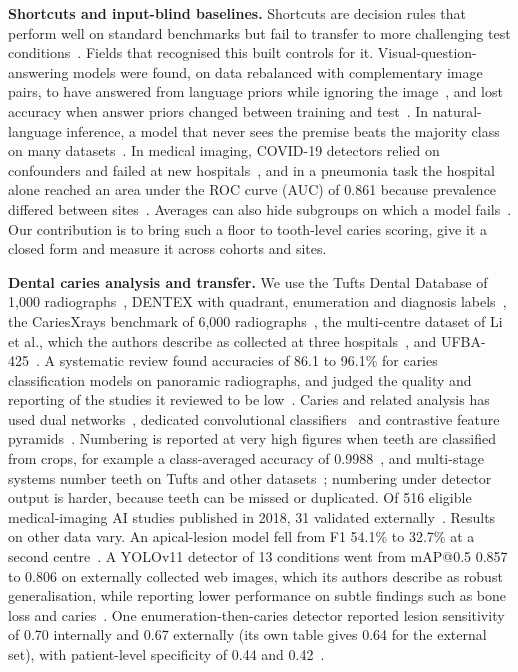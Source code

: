 \documentclass[conference]{IEEEtran}
\begin{document}
\textbf{Shortcuts and input-blind baselines.} Shortcuts are decision rules that perform well on standard benchmarks but fail to transfer to more challenging test conditions~\cite{geirhos2020shortcut}. Fields that recognised this built controls for it. Visual-question-answering models were found, on data rebalanced with complementary image pairs, to have answered from language priors while ignoring the image~\cite{goyal2017making}, and lost accuracy when answer priors changed between training and test~\cite{agrawal2018dont}. In natural-language inference, a model that never sees the premise beats the majority class on many datasets~\cite{poliak2018hypothesis}. In medical imaging, COVID-19 detectors relied on confounders and failed at new hospitals~\cite{degrave2021ai}, and in a pneumonia task the hospital alone reached an area under the ROC curve (AUC) of 0.861 because prevalence differed between sites~\cite{zech2018variable}. Averages can also hide subgroups on which a model fails~\cite{oakdenrayner2020hidden}. Our contribution is to bring such a floor to tooth-level caries scoring, give it a closed form and measure it across cohorts and sites.

\textbf{Dental caries analysis and transfer.} We use the Tufts Dental Database of 1,000 radiographs~\cite{panetta2022tufts}, DENTEX with quadrant, enumeration and diagnosis labels~\cite{hamamci2023dentex}, the CariesXrays benchmark of 6,000 radiographs~\cite{chen2024cariesxrays}, the multi-centre dataset of Li et al., which the authors describe as collected at three hospitals~\cite{li2024multicenter}, and UFBA-425~\cite{budagam2024oralbbnet}. A systematic review found accuracies of 86.1 to 96.1\% for caries classification models on panoramic radiographs, and judged the quality and reporting of the studies it reviewed to be low~\cite{mohammadrahimi2022deep}. Caries and related analysis has used dual networks~\cite{lim2024dual}, dedicated convolutional classifiers~\cite{bilal2024pdcnet} and contrastive feature pyramids~\cite{chen2024cariesxrays}. Numbering is reported at very high figures when teeth are classified from crops, for example a class-averaged accuracy of 0.9988~\cite{zancan2025ai}, and multi-stage systems number teeth on Tufts and other datasets~\cite{zhang2025reliable}; numbering under detector output is harder, because teeth can be missed or duplicated. Of 516 eligible medical-imaging AI studies published in 2018, 31 validated externally~\cite{kim2019design}. Results on other data vary. An apical-lesion model fell from F1 54.1\% to 32.7\% at a second centre~\cite{krois2021generalizability}. A YOLOv11 detector of 13 conditions went from mAP@0.5 0.857 to 0.806 on externally collected web images, which its authors describe as robust generalisation, while reporting lower performance on subtle findings such as bone loss and caries~\cite{mutlu2026comparison}. One enumeration-then-caries detector reported lesion sensitivity of 0.70 internally and 0.67 externally (its own table gives 0.64 for the external set), with patient-level specificity of 0.44 and 0.42~\cite{bizjak2024advancing}.
\end{document}
